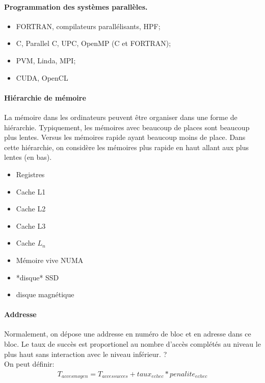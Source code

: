 \documentclass[oneside]{book}
\begin{document}
\paragraph{Programmation des systèmes parallèles.}
\begin{itemize}
\item FORTRAN, compilateurs parallélisants, HPF;
\item C, Parallel C, UPC, OpenMP (C et FORTRAN);
\item PVM, Linda, MPI;
\item CUDA, OpenCL
\end{itemize}

\paragraph{Hiérarchie de mémoire}
La mémoire dans les ordinateurs peuvent être organiser dans une forme de hiérarchie. Typiquement, les mémoires avec beaucoup de places sont beaucoup plus lentes. Versus les mémoires rapide ayant beaucoup moins de place. Dans cette hiérarchie, on considère les mémoires plus rapide en haut allant aux plus lentes (en bas).

\begin{itemize}
\item Registres
\item Cache L1
\item Cache L2
\item Cache L3
\item Cache $L_n$
\item Mémoire vive NUMA
\item *disque* SSD
\item disque magnétique
\end{itemize}

\paragraph{Addresse}
Normalement, on dépose une addresse en numéro de bloc et en adresse dans ce bloc. Le taux de succès est proportionel au nombre d'accès complétés au niveau le plus haut sans interaction avec le niveau inférieur. ? \\

On peut définir:
\begin{align}
T_{acces moyen} = T_{acces succes} + taux_{echec} * penalite_{echec}
\end{align}
\end{document}
